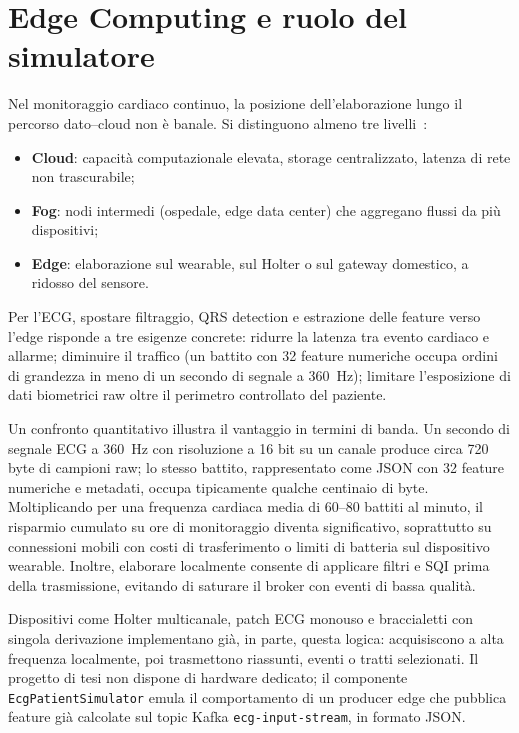 \section{Edge Computing e ruolo del simulatore}\label{sec:edge-computing}

Nel monitoraggio cardiaco continuo, la posizione dell'elaborazione lungo il percorso dato--cloud non è banale.
Si distinguono almeno tre livelli~\cite{kleppmann2017designing}:
\begin{itemize}
  \item \textbf{Cloud}: capacità computazionale elevata, storage centralizzato, latenza di rete non trascurabile;
  \item \textbf{Fog}: nodi intermedi (ospedale, edge data center) che aggregano flussi da più dispositivi;
  \item \textbf{Edge}: elaborazione sul wearable, sul Holter o sul gateway domestico, a ridosso del sensore.
\end{itemize}

Per l'ECG, spostare filtraggio, QRS detection e estrazione delle feature verso l'edge risponde a tre esigenze concrete: ridurre la latenza tra evento cardiaco e allarme; diminuire il traffico (un battito con 32 feature numeriche occupa ordini di grandezza in meno di un secondo di segnale a 360~Hz); limitare l'esposizione di dati biometrici raw oltre il perimetro controllato del paziente.

Un confronto quantitativo illustra il vantaggio in termini di banda.
Un secondo di segnale ECG a 360~Hz con risoluzione a 16 bit su un canale produce circa 720 byte di campioni raw; lo stesso battito, rappresentato come JSON con 32 feature numeriche e metadati, occupa tipicamente qualche centinaio di byte.
Moltiplicando per una frequenza cardiaca media di 60--80 battiti al minuto, il risparmio cumulato su ore di monitoraggio diventa significativo, soprattutto su connessioni mobili con costi di trasferimento o limiti di batteria sul dispositivo wearable.
Inoltre, elaborare localmente consente di applicare filtri e SQI prima della trasmissione, evitando di saturare il broker con eventi di bassa qualità.

Dispositivi come Holter multicanale, patch ECG monouso e braccialetti con singola derivazione implementano già, in parte, questa logica: acquisiscono a alta frequenza localmente, poi trasmettono riassunti, eventi o tratti selezionati.
Il progetto di tesi non dispone di hardware dedicato; il componente \texttt{EcgPatientSimulator} emula il comportamento di un producer edge che pubblica feature già calcolate sul topic Kafka \texttt{ecg-input-stream}, in formato JSON.

